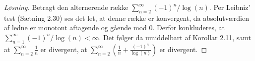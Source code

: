 \begin{opg}
\begin{enumerate}
    \ifanswers
    \begin{proof}[Løsning]
    	Betragt den alternerende række $ \sum_{n=2}^{\infty}(-1)^n/\log(n) $. Per Leibniz' test (Sætning 2.30) ses det let, at denne række er konvergent, da absolutværdien af ledne er monotont aftagende og gående mod $ 0 $. Derfor konkluderes, at $ \sum_{n=1}^{\infty}(-1)^n/\log(n)<\infty $. Det følger da umiddelbart af Korollar 2.11, samt at $ \sum_{n=2}^{\infty}\frac{1}{n} $ er divergent, at $ \sum_{n=2}^{\infty}\left(\frac{1}{n}+\frac{(-1)^n}{\log(n)}\right) $ er divergent.
    	
    \end{proof}
    \fi
\end{enumerate}
\end{opg}

%    
%    
%    

